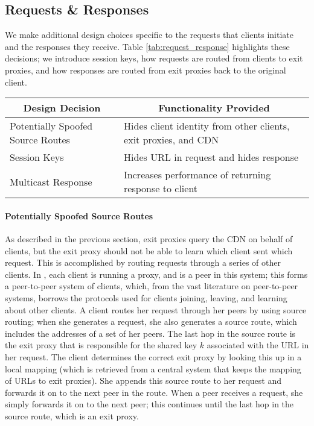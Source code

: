 \subsection{Requests \& Responses}
We make additional design choices specific to the requests that clients initiate and 
the responses they receive.  Table \ref{tab:request_response} highlights these decisions; we 
introduce session keys, how requests are routed from clients to exit proxies, and how responses 
are routed from exit proxies back to the original client.

\begin{table*}[t!]
\centering
\begin{tabular}{| l | l |} 
\hline
 \multicolumn{1}{|c|}{\bf Design Decision} & \multicolumn{1}{|c|}{\bf Functionality Provided} \\
\hline \hline
 Potentially Spoofed Source Routes & {Hides client identity from other clients, exit proxies, and CDN} \\
\hline
 Session Keys & {Hides URL in request and hides response} \\
\hline
 Multicast Response & {Increases performance of returning response to client} \\
\hline
\end{tabular}
\caption{The design decisions associated with content requests and responses, and what these 
decisions provide.}
\label{tab:request_response}
\end{table*}

\paragraph{Potentially Spoofed Source Routes}
As described in the previous section, exit proxies query the CDN on behalf of clients, but the exit proxy 
should not be able to learn which client sent which request.  This is accomplished by routing requests through 
a series of other clients.  In \system{}, each client is running a proxy, and is a peer in this system; this 
forms a peer-to-peer system of clients, which, from the vast literature on peer-to-peer systems, borrows the 
protocols used for clients joining, leaving, and learning about other clients. A client routes her request through 
her peers by using source routing; when she generates a request, she also generates a source route, which includes 
the addresses of a set of her peers.  The last hop in the source route is the exit proxy that is responsible for the 
shared key $k$ associated with the URL in her request.  The client determines the correct exit proxy by looking this 
up in a local mapping (which is retrieved from a central system that keeps the mapping of URLs to exit proxies).  
She appends this source route to her request and forwards it on to the next peer in the route.  When a peer receives 
a request, she simply forwards it on to the next peer; this continues until the last hop in the source route, which 
is an exit proxy. 

